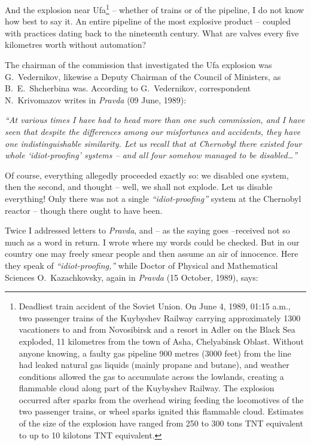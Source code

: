 \documentclass[openright]{bookest}
\begin{document}
And the explosion near Ufa\footnote{Deadliest train accident of the Soviet Union. On June 4, 1989, 01:15 a.m., two passenger trains of the Kuybyshev Railway carrying approximately \num{1300} vacationers to and from Novosibirsk and a resort in Adler on the Black Sea exploded, \num{11} kilometres from the town of Asha, Chelyabinsk Oblast. Without anyone knowing, a faulty gas pipeline \num{900} metres (\num{3000} feet) from the line had leaked natural gas liquids (mainly propane and butane), and weather conditions allowed the gas to accumulate across the lowlands, creating a flammable cloud along part of the Kuybyshev Railway. The explosion occurred after sparks from the overhead wiring feeding the locomotives of the two passenger trains, or wheel sparks ignited this flammable cloud. Estimates of the size of the explosion have ranged from \num{250} to \num{300} tons TNT equivalent to up to \num{10} kilotons TNT equivalent.} -- whether of trains or of the pipeline, I do not know how best to say it. An entire pipeline of the most explosive product -- coupled with practices dating back to the nineteenth century. What are valves every five kilometres worth without automation?

The chairman of the commission that investigated the Ufa explosion was G.~Vedernikov, likewise a Deputy Chairman of the Council of Ministers, as B.~E.~Shcherbina was. According to G.~Vedernikov, correspondent N.~Krivomazov writes in \textit{Pravda} (09 June, 1989):

\begin{personal}
\textit{``At various times I have had to head more than one such commission, and I have seen that despite the differences among our misfortunes and accidents, they have one indistinguishable similarity. Let us recall that at Chernobyl there existed four whole `idiot-proofing' systems -- and all four somehow managed to be disabled\ldots''}
\end{personal}

Of course, everything allegedly proceeded exactly so: we disabled one system, then the second, and thought -- well, we shall not explode. Let us disable everything! Only there was not a single \textit{``idiot-proofing''} system at the Chernobyl reactor -- though there ought to have been.

Twice I addressed letters to \textit{Pravda}, and -- as the saying goes --received not so much as a word in return. I wrote where my words could be checked. But in our country one may freely smear people and then assume an air of innocence. Here they speak of \textit{``idiot-proofing,''} while Doctor of Physical and Mathematical Sciences O.~Kazachkovsky, again in \textit{Pravda} (15 October, 1989), says:
\end{document}
